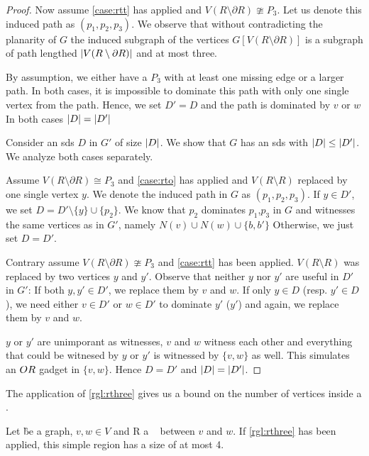 \begin{proof}
         Now assume \cref{case:rtt} has applied and $V(R \setminus \partial R) \ncong P_3$. 
         Let us denote this induced path as $(p_1,p_2,p_3)$. We observe that without contradicting the planarity of $G$ the induced subgraph of the vertices $G[V(R \setminus \partial R)]$ is a subgraph of path lengthed $\abs{V(R \setminus \partial R)}$ and at most three. 

          By assumption, we either have a $P_3$ with at least one missing edge or a larger path. 
          In both cases, it is impossible to dominate this path with only one single vertex from the path.
         Hence, we set $D' = D$ and the path is dominated by $v$ or $w$
         In both cases $\abs{D} = \abs{D'}$
         
         Consider an sds $D$ in $G'$ of size $\abs{D}$. 
         We show that $G$ has an sds with $\abs{D} \leq \abs{D'}$. 
         We analyze both cases separately.

         Assume $V(R \setminus \partial R) \cong P_3$ and \cref{case:rto} has applied and $V(R \setminus R)$ replaced by one single vertex $y$. 
         We denote the induced path in $G$ as $(p_1,p_2,p_3)$.
         If $y \in D'$, we set $D = D' \setminus \{y\} \cup \{p_2\}$. 
         We know that $p_2$ dominates $p_1$,$p_3$ in $G$ and witnesses the same vertices as in $G'$, namely $N(v) \cup N(w) \cup \{b, b'\}$
         Otherwise, we just set $D = D'$. 

         Contrary assume $V(R \setminus \partial R) \ncong P_3$ and \cref{case:rtt} has been applied.
         $V(R \setminus R)$ was replaced by two vertices $y$ and $y'$.
         Observe that neither $y$ nor $y'$ are useful in $D'$ in $G'$: If both $y, y' \in D'$, we replace them by $v$ and $w$.
         If only $y \in D$ (resp. $y' \in D$), we need either $v \in D'$ or $w \in D'$ to dominate $y'$ ($y'$) and again, we replace them by $v$ and $w$. 

         $y$ or $y'$ are unimporant as witnesses, $v$ and $w$ witness each other and everything that could be witnesed by $y$ or $y'$ is witnessed by $\{v,w\}$ as well.
         This simulates an $\mathnormal{OR}$ gadget in $\{v, w\}$.
        Hence $D = D'$ and $\abs{D} = \abs{D'}$.
\end{proof}
    
The application of \cref{rgl:rthree} gives us a bound on the number of vertices inside a \sr. 
\begin{corollary}\label{lemma:simpleregionbound}
    Let \G be a graph, $v, w\in V$ and R a \sr~ between $v$ and $w$. If \cref{rgl:rthree} has been applied, this simple region has a size of at most 4.
\end{corollary}

